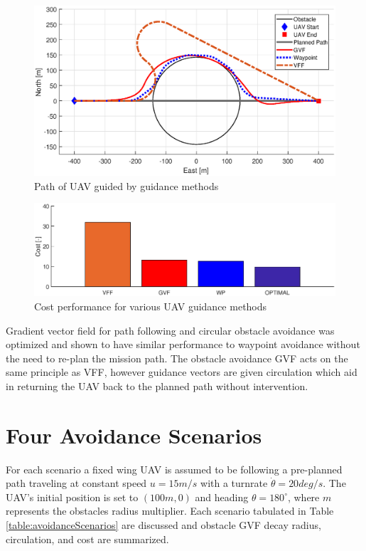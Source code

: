 \documentclass[numbered,pdftex]{ohio-etd}
\begin{document}
\begin{figure}[H]
	\centering
	\includegraphics[trim=0 50 0 65,clip,width=15cm]{Figures/Simulations/compareMethods}
	\caption{Path of UAV guided by guidance methods}
	\label{fig:comparemethods}
\end{figure}


\begin{figure}[H]
	\centering
	\label{fig:barPlotCost}
	\includegraphics[width=15cm]{Figures/Simulations/barPlotPerformance}
	\caption{Cost performance for various UAV guidance methods}
	\label{fig:barplotperformance}
\end{figure}

Gradient vector field for path following and circular obstacle avoidance was optimized and shown to have similar performance to waypoint avoidance without the need to re-plan the mission path. The obstacle avoidance GVF acts on the same principle as VFF, however guidance vectors are given circulation which aid in returning the UAV back to the planned path without intervention. 


\section{Four Avoidance Scenarios}
For each scenario a fixed wing UAV is assumed to be following a pre-planned path traveling at constant speed $u=15m/s$ with a turnrate $\dot{\theta}=20 deg/s$. The UAV's initial position is set to $(100m,0)$ and heading $\theta = 180^\circ$, where $m$ represents the obstacles radius multiplier. Each scenario tabulated in Table \ref{table:avoidanceScenarios} are discussed and obstacle GVF decay radius, circulation, and cost are summarized.\\
\end{document}

